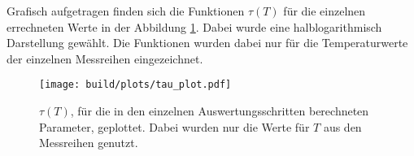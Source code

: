 \noindent
Grafisch aufgetragen finden sich die Funktionen $\tau(T)$ für die einzelnen errechneten Werte in der Abbildung \ref{img:tau}. 
Dabei wurde eine halblogarithmisch Darstellung gewählt. Die Funktionen wurden dabei nur für die Temperaturwerte der einzelnen Messreihen eingezeichnet.

\begin{figure}[ht]
  \centering
  \texttt{[image: build/plots/tau\_plot.pdf]}
  \caption{$\tau(T)$, für die in den einzelnen Auswertungsschritten berechneten Parameter, geplottet. 
          Dabei wurden nur die Werte für $T$ aus den Messreihen genutzt.  }
  \label{img:tau}
\end{figure}
